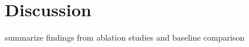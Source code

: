 \section{Discussion}
\label{sec:results-discussion}

\begin{todo}
  summarize findings from ablation studies and baseline comparison
\end{todo}
